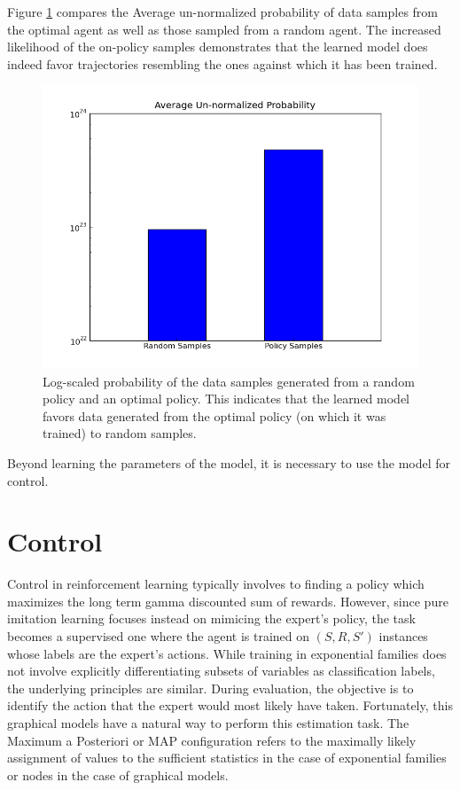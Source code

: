 \documentclass{article} %
\begin{document}
Figure \ref{fig:learning} compares the Average un-normalized probability of data samples from the optimal agent as well as those sampled from a random agent. The increased likelihood of the on-policy samples demonstrates that the learned model does indeed favor trajectories resembling the ones against which it has been trained.

\begin{figure}[htp]
  \centering
  \includegraphics[width=.8\textwidth]{figures/graph.png}
  \caption{Log-scaled probability of the data samples generated from a random policy and an optimal policy. This indicates that the learned model favors data generated from the optimal policy (on which it was trained) to random samples.}
  \label{fig:learning}
\end{figure}

Beyond learning the parameters of the model, it is necessary to use the model for control.

\section{Control}

Control in reinforcement learning typically involves to finding a policy which maximizes the long term gamma discounted sum of rewards. However, since pure imitation learning focuses instead on mimicing the expert's policy, the task becomes a supervised one where the agent is trained on $(S,R,S')$ instances whose labels are the expert's actions. While training in exponential families does not involve explicitly differentiating subsets of variables as classification labels, the underlying principles are similar. During evaluation, the objective is to identify the action that the expert would most likely have taken. Fortunately, this graphical models have a natural way to perform this estimation task. The Maximum a Posteriori or MAP configuration refers to the maximally likely assignment of values to the sufficient statistics in the case of exponential families or nodes in the case of graphical models.
\end{document}
